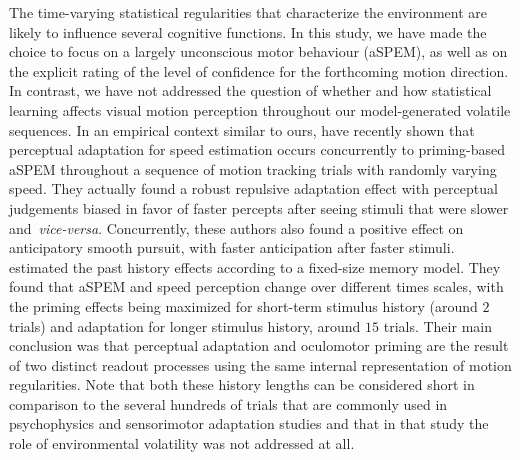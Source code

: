 \documentclass[12pt,english]{article}%
\newcommand{\citet}[1]{\textcite{#1}}
\begin{document}
The time-varying statistical regularities that characterize the environment are likely to influence several cognitive functions. In this study, we have made the choice to focus on a largely unconscious motor behaviour (aSPEM), as well as on the explicit rating of the level of confidence for the forthcoming motion direction. In contrast, we have not addressed the question of whether and how statistical learning affects visual motion perception throughout our model-generated volatile sequences.
In an empirical context similar to ours, \citet{Maus2015} have recently shown that
perceptual adaptation for speed estimation occurs concurrently to
priming-based aSPEM throughout a sequence of motion tracking trials with randomly varying speed. They actually found a robust repulsive adaptation effect
with perceptual judgements biased in favor of faster percepts
after seeing stimuli that were slower and~\textit{vice-versa}.
Concurrently, these authors also found
a positive effect on anticipatory smooth pursuit,
with faster anticipation after faster stimuli.
\citet{Maus2015} estimated the past history effects according to a fixed-size memory model. They found that aSPEM and speed perception change over different times scales,
with the priming effects being maximized
for short-term stimulus history (around $2$ trials) and
adaptation for longer stimulus history, around $15$ trials.
Their main conclusion was that
perceptual adaptation and oculomotor priming
are the result of two distinct readout processes
using the same internal representation of motion regularities.
Note that both these history lengths can be considered
short in comparison to the several hundreds
of trials that are commonly used in psychophysics and sensorimotor adaptation studies and that in that study the role of environmental volatility was not addressed at all.
\end{document}
